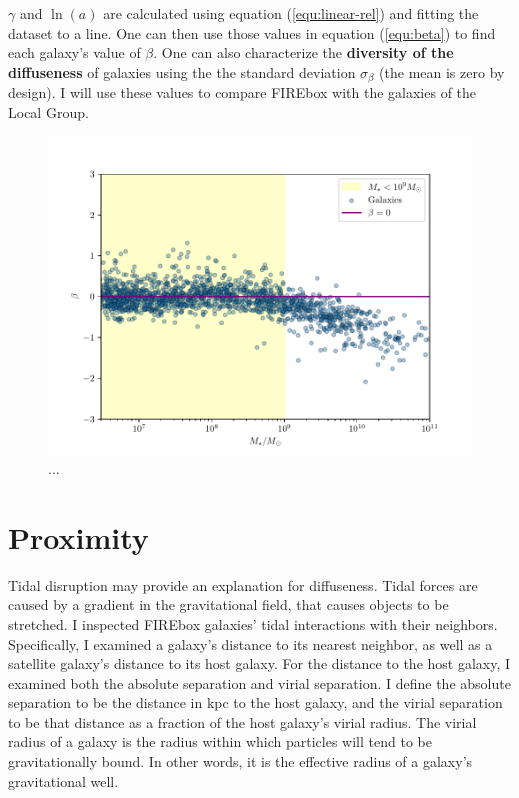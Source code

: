 $\gamma$ and $\ln(a)$ are calculated using equation (\ref{equ:linear-rel}) and fitting the dataset to a line. One can then use those values in equation (\ref{equ:beta}) to find each galaxy's value of $\beta$. One can also characterize the \textbf{diversity of the diffuseness} of galaxies using the the standard deviation $\sigma_\beta$ (the mean is zero by design). I will use these values to compare FIREbox with the galaxies of the Local Group.

\begin{figure}
    \centering
    \includegraphics*[width=\textwidth*2/3]{figs/me/beta-mass.pdf}
    \caption{...}
    \label{fig:beta-mass}
\end{figure}

\section{Proximity}


 Tidal disruption may provide an explanation for diffuseness. Tidal forces are caused by a gradient in the gravitational field, that causes objects to be stretched. I inspected FIREbox galaxies' tidal interactions with their neighbors. Specifically, I examined a galaxy's distance to its nearest neighbor, as well as a satellite galaxy's distance to its host galaxy. For the distance to the host galaxy, I examined both the absolute separation and virial separation. I define the absolute separation to be the distance in kpc to the host galaxy, and the virial separation to be that distance as a fraction of the host galaxy's virial radius. The virial radius of a galaxy is the radius within which particles will tend to be gravitationally bound. In other words, it is the effective radius of a galaxy's gravitational well.

